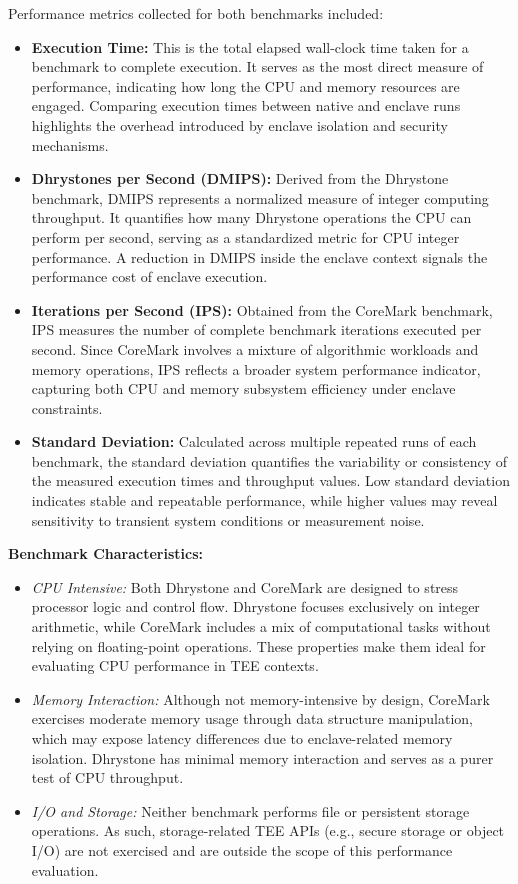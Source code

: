 Performance metrics collected for both benchmarks included:
\begin{itemize}
    \item \textbf{Execution Time:} This is the total elapsed wall-clock time taken for a benchmark to complete execution. It serves as the most direct measure of performance, indicating how long the CPU and memory resources are engaged. Comparing execution times between native and enclave runs highlights the overhead introduced by enclave isolation and security mechanisms.

    \item \textbf{Dhrystones per Second (DMIPS):} Derived from the Dhrystone benchmark, DMIPS represents a normalized measure of integer computing throughput. It quantifies how many Dhrystone operations the CPU can perform per second, serving as a standardized metric for CPU integer performance. A reduction in DMIPS inside the enclave context signals the performance cost of enclave execution.

    \item \textbf{Iterations per Second (IPS):} Obtained from the CoreMark benchmark, IPS measures the number of complete benchmark iterations executed per second. Since CoreMark involves a mixture of algorithmic workloads and memory operations, IPS reflects a broader system performance indicator, capturing both CPU and memory subsystem efficiency under enclave constraints.

    \item \textbf{Standard Deviation:} Calculated across multiple repeated runs of each benchmark, the standard deviation quantifies the variability or consistency of the measured execution times and throughput values. Low standard deviation indicates stable and repeatable performance, while higher values may reveal sensitivity to transient system conditions or measurement noise.

\end{itemize}

\noindent\textbf{Benchmark Characteristics:}
\begin{itemize}
    \item \textit{CPU Intensive:} Both Dhrystone and CoreMark are designed to stress processor logic and control flow. Dhrystone focuses exclusively on integer arithmetic, while CoreMark includes a mix of computational tasks without relying on floating-point operations. These properties make them ideal for evaluating CPU performance in TEE contexts.
    
    \item \textit{Memory Interaction:} Although not memory-intensive by design, CoreMark exercises moderate memory usage through data structure manipulation, which may expose latency differences due to enclave-related memory isolation. Dhrystone has minimal memory interaction and serves as a purer test of CPU throughput.

    \item \textit{I/O and Storage:} Neither benchmark performs file or persistent storage operations. As such, storage-related TEE APIs (e.g., secure storage or object I/O) are not exercised and are outside the scope of this performance evaluation.
\end{itemize}

